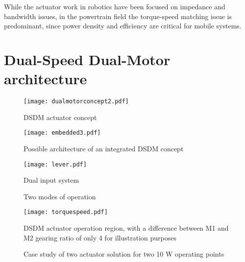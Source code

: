 While the actuator work in robotics have been focused on impedance and bandwidth issues, in the powertrain field the torque-speed matching issue is predominant, since power density and efficiency are critical for mobile systems.


\section{Dual-Speed Dual-Motor architecture}
\label{sec:DSDM}


\begin{figure}[H]
	\centering
		\texttt{[image: dualmotorconcept2.pdf]}
	\caption{DSDM actuator concept}
	\label{fig:dualmotorconcept}
\end{figure}


\begin{figure}[H]
	\centering
		\texttt{[image: embedded3.pdf]}
	\caption{Possible architecture of an integrated DSDM concept}
	\label{fig:embedded}
\end{figure}


\begin{figure}[H]
	\centering
		\texttt{[image: lever.pdf]}
	\caption{Dual input system}
	\label{fig:lever}
\end{figure}
%
\begin{figure}[H]
        \centering
        \caption{Two modes of operation}\label{fig:opmode}
\end{figure}

\begin{figure}[H]
	\centering
		\texttt{[image: torquespeed.pdf]}
	\caption{DSDM actuator operation region, with a difference between M1 and M2 gearing ratio of only 4 for illustration purposes }
	\label{fig:torquespeed}
\end{figure}


\begin{figure}[H]
        \centering
        \caption{Case study of two actuator solution for two 10 W operating points }\label{fig:solutions}
\end{figure}

